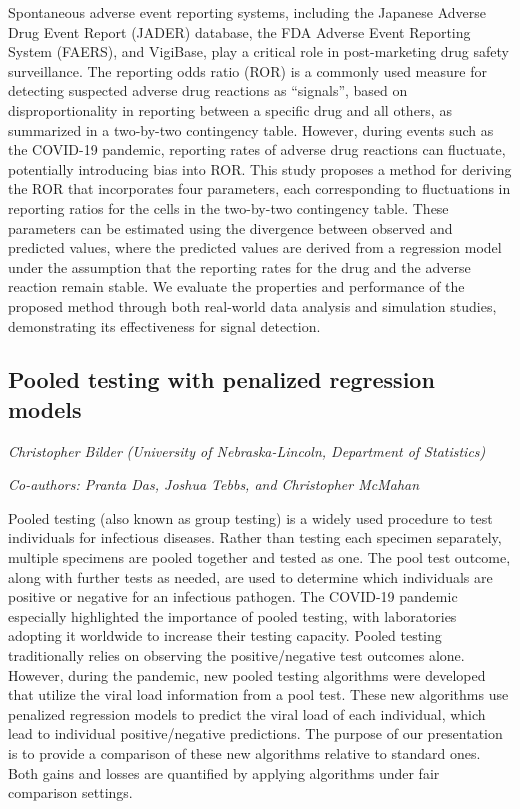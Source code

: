 \documentclass[
]{scrreprt}
\begin{document}
Spontaneous adverse event reporting systems, including the Japanese
Adverse Drug Event Report (JADER) database, the FDA Adverse Event
Reporting System (FAERS), and VigiBase, play a critical role in
post-marketing drug safety surveillance. The reporting odds ratio (ROR)
is a commonly used measure for detecting suspected adverse drug
reactions as ``signals'', based on disproportionality in reporting
between a specific drug and all others, as summarized in a two-by-two
contingency table. However, during events such as the COVID-19 pandemic,
reporting rates of adverse drug reactions can fluctuate, potentially
introducing bias into ROR. This study proposes a method for deriving the
ROR that incorporates four parameters, each corresponding to
fluctuations in reporting ratios for the cells in the two-by-two
contingency table. These parameters can be estimated using the
divergence between observed and predicted values, where the predicted
values are derived from a regression model under the assumption that the
reporting rates for the drug and the adverse reaction remain stable. We
evaluate the properties and performance of the proposed method through
both real-world data analysis and simulation studies, demonstrating its
effectiveness for signal detection.

\subsection{Pooled testing with penalized regression
models}\label{pooled-testing-with-penalized-regression-models}

\emph{Christopher Bilder} \emph{(University
of Nebraska-Lincoln, Department of Statistics)}

\emph{Co-authors: Pranta Das, Joshua Tebbs, and Christopher McMahan}

\setlength{\parskip}{0.5em}

Pooled testing (also known as group testing) is a widely used procedure
to test individuals for infectious diseases. Rather than testing each
specimen separately, multiple specimens are pooled together and tested
as one. The pool test outcome, along with further tests as needed, are
used to determine which individuals are positive or negative for an
infectious pathogen. The COVID-19 pandemic especially highlighted the
importance of pooled testing, with laboratories adopting it worldwide to
increase their testing capacity. Pooled testing traditionally relies on
observing the positive/negative test outcomes alone. However, during the
pandemic, new pooled testing algorithms were developed that utilize the
viral load information from a pool test. These new algorithms use
penalized regression models to predict the viral load of each
individual, which lead to individual positive/negative predictions. The
purpose of our presentation is to provide a comparison of these new
algorithms relative to standard ones. Both gains and losses are
quantified by applying algorithms under fair comparison settings.
\end{document}
